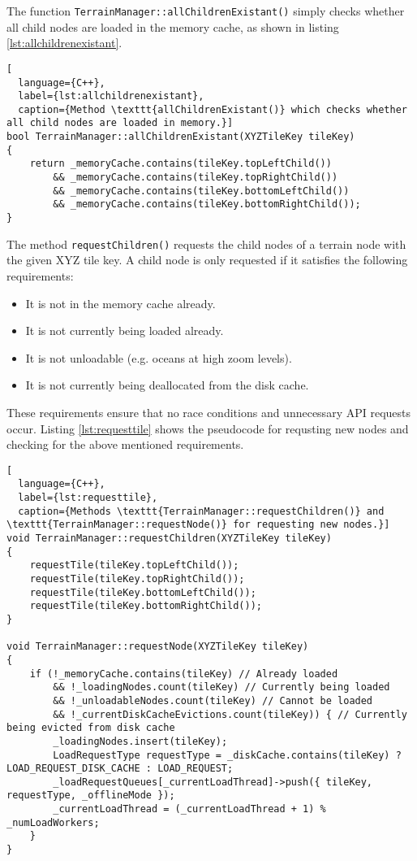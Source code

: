 The function \texttt{TerrainManager::allChildrenExistant()} simply checks 
whether all child nodes are loaded in the memory cache, 
as shown in listing \ref{lst:allchildrenexistant}.

\begin{lstlisting}[
  language={C++},
  label={lst:allchildrenexistant},
  caption={Method \texttt{allChildrenExistant()} which checks whether all child nodes are loaded in memory.}]
bool TerrainManager::allChildrenExistant(XYZTileKey tileKey)
{
    return _memoryCache.contains(tileKey.topLeftChild())
        && _memoryCache.contains(tileKey.topRightChild())
        && _memoryCache.contains(tileKey.bottomLeftChild())
        && _memoryCache.contains(tileKey.bottomRightChild());
}
\end{lstlisting}

The method \texttt{requestChildren()}
requests the child nodes of a terrain node with the given XYZ tile key.
A child node is only requested if it satisfies the following requirements:
\begin{itemize}
  \item It is not in the memory cache already.
  \item It is not currently being loaded already.
  \item It is not unloadable (e.g. oceans at high zoom levels).
  \item It is not currently being deallocated from the disk cache.
\end{itemize}
These requirements ensure that no race conditions and unnecessary API requests occur.
Listing \ref{lst:requesttile} shows the pseudocode for requsting new nodes and
checking for the above mentioned requirements.
\begin{lstlisting}[
  language={C++},
  label={lst:requesttile},
  caption={Methods \texttt{TerrainManager::requestChildren()} and \texttt{TerrainManager::requestNode()} for requesting new nodes.}]
void TerrainManager::requestChildren(XYZTileKey tileKey)
{
    requestTile(tileKey.topLeftChild());
    requestTile(tileKey.topRightChild());
    requestTile(tileKey.bottomLeftChild());
    requestTile(tileKey.bottomRightChild());
}

void TerrainManager::requestNode(XYZTileKey tileKey)
{
    if (!_memoryCache.contains(tileKey) // Already loaded
        && !_loadingNodes.count(tileKey) // Currently being loaded
        && !_unloadableNodes.count(tileKey) // Cannot be loaded
        && !_currentDiskCacheEvictions.count(tileKey)) { // Currently being evicted from disk cache
        _loadingNodes.insert(tileKey);
        LoadRequestType requestType = _diskCache.contains(tileKey) ? LOAD_REQUEST_DISK_CACHE : LOAD_REQUEST;
        _loadRequestQueues[_currentLoadThread]->push({ tileKey, requestType, _offlineMode });
        _currentLoadThread = (_currentLoadThread + 1) % _numLoadWorkers;
    }
}
\end{lstlisting}
